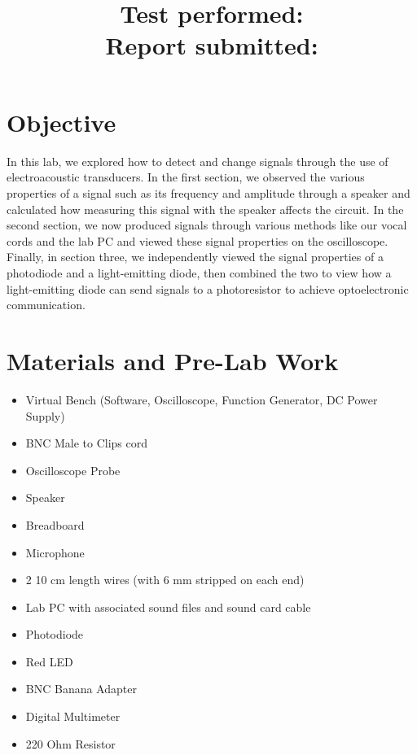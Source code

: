 \documentclass[10pt]{article}
\title{
    \textbf{\courseTitle} \\
    \textbf{\documentTitle} \\
    \bigskip
    \textbf{\large{Test performed: \testDate}} \\
    \textbf{\large{Report submitted: \reportDate}} \\
    \bigskip
    \bigskip
}
\author{\documentAuthor}
\date{}
\begin{document}
\maketitle

\newpage

\section{Objective}

In this lab, we explored how to detect and change signals through the use of electroacoustic transducers. In the first section, we observed the various properties of a signal such as its frequency and amplitude through a speaker and calculated how measuring this signal with the speaker affects the circuit. In the second section, we now produced signals through various methods like our vocal cords and the lab PC and viewed these signal properties on the oscilloscope. Finally, in section three, we independently viewed the signal properties of a photodiode and a light-emitting diode, then combined the two to view how a light-emitting diode can send signals to a photoresistor to achieve optoelectronic communication. 

\medskip





\section{Materials and Pre-Lab Work}

\begin{itemize}
	\item Virtual Bench (Software, Oscilloscope, Function Generator, DC Power Supply)
	\item BNC Male to Clips cord
	\item Oscilloscope Probe
	\item Speaker
	\item Breadboard
	\item Microphone
	\item 2 10 cm length wires (with 6 mm stripped on each end)
	\item Lab PC with associated sound files and sound card cable
	\item Photodiode 
	\item Red LED
	\item BNC Banana Adapter
	\item Digital Multimeter
	\item 220 Ohm Resistor
\end{itemize}
\end{document}
